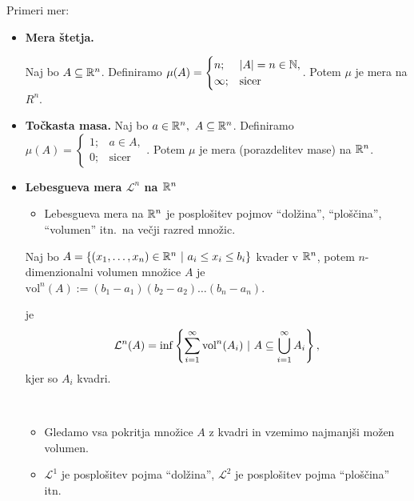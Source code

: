 \begin{primer} Primeri mer:
    \begin{itemize}
        \item \textbf{Mera štetja.}
        
        Naj bo \(A \subseteq \mathbb{R}^n\). Definiramo \(\mu(A) = \begin{cases}
            n; &|A| = n \in \mathbb{N}, \\ \infty; &\text{sicer}
        \end{cases}\).
        Potem \(\mu\) je mera na \(R^n\).
        \item \textbf{Točkasta masa.}
        Naj bo \(a \in \mathbb{R}^n, \ A \subseteq \mathbb{R}^n\). Definiramo \(\mu(A) = \begin{cases}
            1; &a \in A, \\ 0; &\text{sicer}
        \end{cases}\).
        Potem \(\mu\) je mera (porazdelitev mase) na \(\mathbb{R}^n\).
        \newpage
        \item \textbf{Lebesgueva mera \(\mathcal{L}^n\) na \(\mathbb{R}^n\)}
        \begin{itemize}
            \item Lebesgueva mera na \(\mathbb{R}^n\) je posplošitev pojmov "`dolžina"', "`ploščina"', "`volumen"' itn.\  na večji razred množic.                  
        \end{itemize}
        Naj bo \(A = \left\{(x_1, \ldots, x_n) \in \mathbb{R}^n \ | \  a_i \leq x_i \leq b_i\right\}\) kvader v \(\mathbb{R}^n\), potem \(n\)-dimenzionalni volumen množice \(A\) je \(\text{vol}^n(A) := (b_1 - a_1)(b_2-a_2)\ldots(b_n - a_n)\).
        \begin{definicija}
             je 
            \[\mathcal{L}^n(A) = \inf \left\{\sum_{i=1}^{\infty} \text{vol}^n(A_i)  \ | \ A \subseteq \bigcup_{i =1}^\infty A_i\right\},\]
            kjer so \(A_i\) kvadri.
        \end{definicija}  
        \begin{opomba} \
            \begin{itemize}
                \item Gledamo vsa pokritja množice \(A\) z kvadri in vzemimo najmanjši možen volumen.
                \item \(\mathcal{L}^1\) je posplošitev pojma "`dolžina"', \(\mathcal{L}^2\) je posplošitev pojma "`ploščina"' itn.
            \end{itemize}            
        \end{opomba}  
    \end{itemize}
\end{primer}